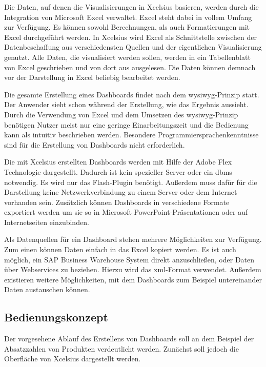 \begin{onehalfspacing}
Die Daten, auf denen die Visualisierungen in \gls{Xcelsius} basieren, werden durch die Integration von Microsoft Excel verwaltet. Excel steht dabei in vollem Umfang zur Verfügung. Es können sowohl  Berechnungen, als auch Formatierungen mit Excel durchgeführt werden. In \gls{Xcelsius} wird Excel als Schnittstelle zwischen der Datenbeschaffung aus verschiedensten Quellen und der eigentlichen Visualisierung genutzt. Alle Daten, die visualisiert werden sollen, werden in ein Tabellenblatt von Excel geschrieben und von dort aus ausgelesen. Die Daten können demnach vor der Darstellung in Excel beliebig bearbeitet werden. 

Die gesamte Erstellung eines Dashboards findet nach dem \gls{wysiwyg}-Prinzip statt. Der Anwender sieht schon während der Erstellung, wie das Ergebnis aussieht. Durch die Verwendung von Excel und dem Umsetzen des \gls{wysiwyg}-Prinzip benötigen Nutzer meist nur eine geringe Einarbeitungszeit und die Bedienung kann als intuitiv beschrieben werden. Besondere Programmiersprachenkenntnisse sind für die Erstellung von Dashboards nicht erforderlich.

Die mit \gls{Xcelsius} erstellten Dashboards werden mit Hilfe der Adobe Flex Technologie dargestellt. Dadurch ist kein spezieller Server oder ein \gls{dbms} notwendig. Es wird nur das Flash-Plugin benötigt. Außerdem muss dafür für die Darstellung keine Netzwerkverbindung zu einem Server oder dem Internet vorhanden sein.  Zusätzlich können Dashboards in verschiedene Formate exportiert werden um sie so in Microsoft PowerPoint-Präsentationen oder auf Internetseiten einzubinden.

Als Datenquellen für ein Dashboard stehen mehrere Möglichkeiten zur Verfügung. Zum einen können Daten einfach in das Excel kopiert werden.  Es ist auch möglich, ein SAP Business Warehouse System direkt anzuschließen, oder Daten über Webservices zu beziehen. Hierzu wird das \gls{xml}-Format verwendet. Außerdem existieren weitere Möglichkeiten, mit dem Dashboards zum Beispiel untereinander Daten austauschen können.

\subsection{Bedienungskonzept}
Der vorgesehene Ablauf des Erstellens von Dashboards soll an dem Beispiel der Absatzzahlen von Produkten verdeutlicht werden. Zunächst soll jedoch die Oberfläche von \gls{Xcelsius} dargestellt werden.


\end{onehalfspacing}
